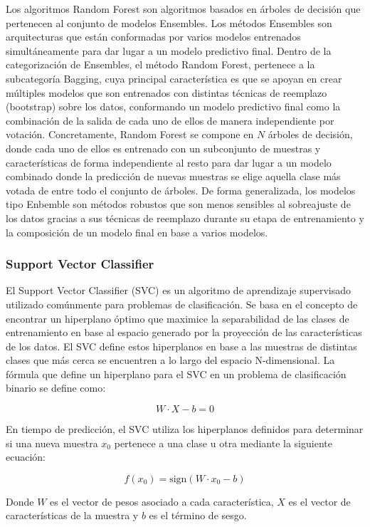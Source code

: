 \documentclass{uathesis-es}
\begin{document}
Los algoritmos Random Forest son algoritmos basados en árboles de decisión que pertenecen al conjunto de modelos Ensembles. Los métodos Ensembles son arquitecturas que están conformadas por varios modelos entrenados simultáneamente para dar lugar a un modelo predictivo final. Dentro de la categorización de Ensembles, el método Random Forest, pertenece a la subcategoría Bagging, cuya principal característica es que se apoyan en crear múltiples modelos que son entrenados con distintas técnicas de reemplazo (bootstrap) sobre los datos, conformando un modelo predictivo final como la combinación de la salida de cada uno de ellos de manera independiente por votación. Concretamente, Random Forest se compone en $N$ árboles de decisión, donde cada uno de ellos es entrenado con un subconjunto de muestras y características de forma independiente al resto para dar lugar a un modelo combinado donde la predicción de nuevas muestras se elige aquella clase más votada de entre todo el conjunto de árboles. De forma generalizada, los modelos tipo Enbemble son métodos robustos que son menos sensibles al sobreajuste de los datos gracias a sus técnicas de reemplazo durante su etapa de entrenamiento y la composición de un modelo final en base a varios modelos.

\subsubsection*{Support Vector Classifier}

El Support Vector Classifier (SVC) es un algoritmo de aprendizaje supervisado utilizado comúnmente para problemas de clasificación. Se basa en el concepto de encontrar un hiperplano óptimo que maximice la separabilidad de las clases de entrenamiento en base al espacio generado por la proyección de las características de los datos. El SVC define estos hiperplanos en base a las muestras de distintas clases que más cerca se encuentren a lo largo del espacio N-dimensional. La fórmula que define un hiperplano para el SVC en un problema de clasificación binario se define como:

\[
W \cdot X - b = 0
\]

En tiempo de predicción, el SVC utiliza los hiperplanos definidos para determinar si una nueva muestra $x_0$ pertenece a una clase u otra mediante la siguiente ecuación:

\[
f({x_0}) = \text{sign}({W} \cdot {x_0} - b)
\]

Donde $W$ es el vector de pesos asociado a cada característica, $X$ es el vector de características de la muestra y $b$ es el término de sesgo.
\end{document}
